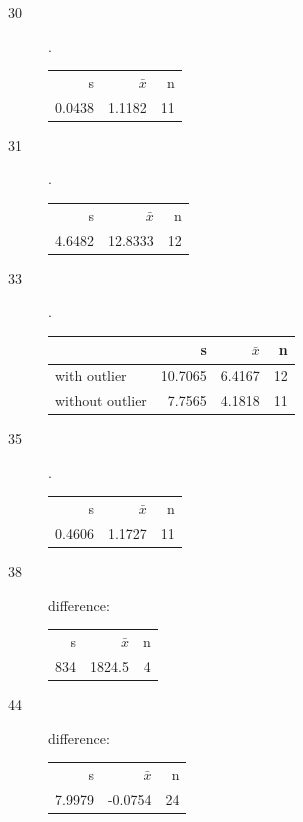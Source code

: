 \documentclass[letterpaper]{exam}
\begin{document}
  \begin{description}
    \item[30].

      \begin{tabular}{rrr}
        \toprule
        s      & $\bar{x}$ & n \\
        0.0438 & 1.1182    & 11 \\
        \bottomrule
      \end{tabular}

    \item[31].

      \begin{tabular}{rrr}
        \toprule
        s      & $\bar{x}$ & n \\
        4.6482 & 12.8333   & 12 \\
        \bottomrule
      \end{tabular}
      
    \item[33].

      \begin{tabular}{lrrr}
        \toprule
                         & s       & $\bar{x}$ & n \\
        \midrule
        with outlier     & 10.7065 & 6.4167    & 12 \\
        without outlier  & 7.7565  & 4.1818    & 11 \\
        \bottomrule
      \end{tabular}

    \item[35].

      \begin{tabular}{rrr}
        \toprule
        s      & $\bar{x}$ & n \\
        0.4606 & 1.1727    & 11 \\
        \bottomrule
      \end{tabular}
      
    \item[38] difference:

      \begin{tabular}{rrr}
        \toprule
        s   & $\bar{x}$ & n \\
        834 & 1824.5    & 4 \\
        \bottomrule
      \end{tabular}
      
    \item[44] difference:

      \begin{tabular}{rrr}
        \toprule
        s      & $\bar{x}$ & n \\
        7.9979 & -0.0754   & 24 \\
        \bottomrule
      \end{tabular}


\end{description}
\end{document}
